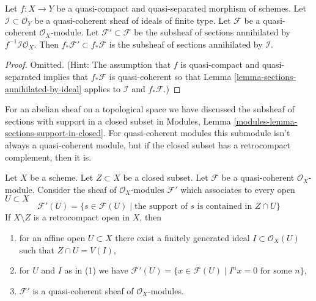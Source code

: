\begin{lemma}
\label{lemma-push-sections-annihilated-by-ideal}
Let $f : X \to Y$ be a quasi-compact and quasi-separated morphism
of schemes. Let $\mathcal{I} \subset \mathcal{O}_Y$ be a quasi-coherent
sheaf of ideals of finite type. Let $\mathcal{F}$ be a quasi-coherent
$\mathcal{O}_X$-module. Let $\mathcal{F}' \subset \mathcal{F}$
be the subsheaf of sections annihilated by $f^{-1}\mathcal{I}\mathcal{O}_X$.
Then $f_*\mathcal{F}' \subset f_*\mathcal{F}$ is the subsheaf
of sections annihilated by $\mathcal{I}$.
\end{lemma}

\begin{proof}
Omitted. (Hint: The assumption that $f$ is quasi-compact and
quasi-separated implies that $f_*\mathcal{F}$ is quasi-coherent
so that Lemma \ref{lemma-sections-annihilated-by-ideal} applies
to $\mathcal{I}$ and $f_*\mathcal{F}$.)
\end{proof}

\noindent
For an abelian sheaf on a topological space we have discussed the subsheaf
of sections with support in a closed subset in
Modules, Lemma \ref{modules-lemma-sections-support-in-closed}.
For quasi-coherent modules this submodule isn't always a quasi-coherent
module, but if the closed subset has a retrocompact complement, then
it is.

\begin{lemma}
\label{lemma-sections-supported-on-closed-subset}
Let $X$ be a scheme. Let $Z \subset X$ be a closed subset.
Let $\mathcal{F}$ be a quasi-coherent $\mathcal{O}_X$-module.
Consider the sheaf of $\mathcal{O}_X$-modules $\mathcal{F}'$
which associates to every open $U \subset X$
$$
\mathcal{F}'(U)
=
\{s \in \mathcal{F}(U) \mid
\text{the support of }s\text{ is contained in }Z \cap U\}
$$
If $X \setminus Z$ is a retrocompact open in $X$, then
\begin{enumerate}
\item for an affine open $U \subset X$ there exist a finitely generated
ideal $I \subset \mathcal{O}_X(U)$ such that $Z \cap U = V(I)$,
\item for $U$ and $I$ as in (1) we have
$\mathcal{F}'(U) = \{x \in \mathcal{F}(U) \mid
I^nx = 0 \text{ for some } n\}$,
\item $\mathcal{F}'$ is a quasi-coherent sheaf of $\mathcal{O}_X$-modules.
\end{enumerate}
\end{lemma}

